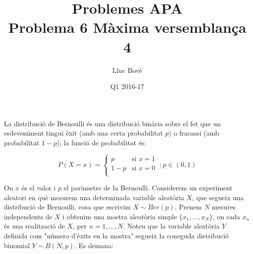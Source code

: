 \documentclass[a4paper]{article}
\title{Problemes APA \\ Problema 6 Màxima versemblança 4}
\author{Lluc Bové}
\date{Q1 2016-17}
\begin{document}
\maketitle

La distribució de Bernoulli és una distribució binària sobre el fet que un esdeveniment tingui èxit (amb una certa probabilitat $p$) o fracassi (amb probabilitat $1-p$); la funció de probabilitat és:

\[ 
P(X = x) =
 \begin{cases}
	p & \text{si } x=1 \\
	1 - p & \text{si } x=0 \\
\end{cases}
  \; ;p \in (0,1)
\]

On $x$ és el valor i $p$ el paràmetre de la Bernoulli. Considerem un experiment aleatori en què mesurem una determinada variable aleatòria $X$, que segueix una distribució de Bernoulli, cosa que escrivim $X \sim Ber(p)$. Prenem $N$ mesures independents de $X$ i obtenim una mostra aleatòria simple $\{x_1,\dots,x_N\}$, on cada $x_n$ és una realització de $X$, per $n = 1,\dots,N$. Noteu que la variable aleatòria $Y$ definida com "número d'èxits en la mostra" segueix la coneguda distribució binomial $Y \sim B(N,p)$. Es demana:
\end{document}
